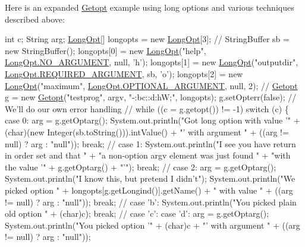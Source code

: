 Here is an expanded \hyperlink{classgnu_1_1getopt_1_1_getopt}{Getopt} example using long options and various techniques described above: 


\begin{DoxyPre}
 int c;
 String arg;
 \hyperlink{classgnu_1_1getopt_1_1_long_opt}{LongOpt}[] longopts = new \hyperlink{classgnu_1_1getopt_1_1_long_opt}{LongOpt}[3];
 // 
 StringBuffer sb = new StringBuffer();
 longopts[0] = new \hyperlink{classgnu_1_1getopt_1_1_long_opt}{LongOpt}("help", \hyperlink{classgnu_1_1getopt_1_1_long_opt_a5af856e8de6a5f528d4da2b8706f7abe}{LongOpt.NO\_ARGUMENT}, null, 'h');
 longopts[1] = new \hyperlink{classgnu_1_1getopt_1_1_long_opt}{LongOpt}("outputdir", \hyperlink{classgnu_1_1getopt_1_1_long_opt_a8105c98436b46a0b4de39a3afab230c2}{LongOpt.REQUIRED\_ARGUMENT}, sb, 'o'); 
 longopts[2] = new \hyperlink{classgnu_1_1getopt_1_1_long_opt}{LongOpt}("maximum", \hyperlink{classgnu_1_1getopt_1_1_long_opt_a31819aae074fa1d80f547817640b31c1}{LongOpt.OPTIONAL\_ARGUMENT}, null, 2);
 // 
 \hyperlink{classgnu_1_1getopt_1_1_getopt}{Getopt} g = new \hyperlink{classgnu_1_1getopt_1_1_getopt}{Getopt}("testprog", argv, "-:bc::d:hW;", longopts);
 g.setOpterr(false); // We'll do our own error handling
 //
 while ((c = g.getopt()) != -1)
   switch (c)
     \{
        case 0:
          arg = g.getOptarg();
          System.out.println("Got long option with value '" +
                             (char)(new Integer(sb.toString())).intValue()
                             + "' with argument " +
                             ((arg != null) ? arg : "null"));
          break;
          //
        case 1:
          System.out.println("I see you have return in order set and that " +
                             "a non-option argv element was just found " +
                             "with the value '" + g.getOptarg() + "'");
          break;
          //
        case 2:
          arg = g.getOptarg();
          System.out.println("I know this, but pretend I didn't");
          System.out.println("We picked option " +
                             longopts[g.getLongind()].getName() +
                           " with value " + 
                           ((arg != null) ? arg : "null"));
          break;
          //
        case 'b':
          System.out.println("You picked plain old option " + (char)c);
          break;
          //
        case 'c':
        case 'd':
          arg = g.getOptarg();
          System.out.println("You picked option '" + (char)c + 
                             "' with argument " +
                             ((arg != null) ? arg : "null"));

\end{DoxyPre}
